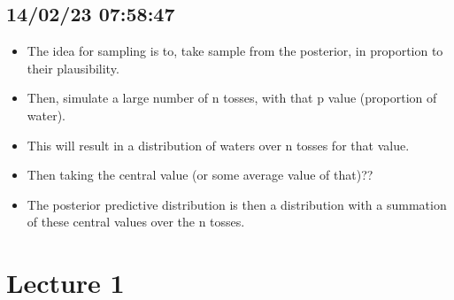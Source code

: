 \documentclass[11pt]{article}
\begin{document}
\hypertarget{section}{%
\subsection{14/02/23 07:58:47}\label{section}}

\begin{itemize}
\tightlist
\item
  The idea for sampling is to, take sample from the posterior, in
  proportion to their plausibility.
\item
  Then, simulate a large number of n tosses, with that p value
  (proportion of water).
\item
  This will result in a distribution of waters over n tosses for that
  value.
\item
  Then taking the central value (or some average value of that)??
\item
  The posterior predictive distribution is then a distribution with a
  summation of these central values over the n tosses.
\end{itemize}

\hypertarget{lecture-1}{%
\section{Lecture 1}\label{lecture-1}}
\end{document}
